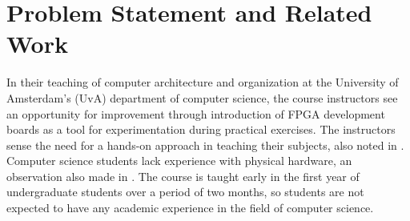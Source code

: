 \documentclass[openright]{template/uva-bachelor-thesis}
\begin{document}





\section{Problem Statement and Related Work}
In their teaching of computer architecture and organization at the University of Amsterdam's (UvA) department of computer science, the course instructors see an opportunity for improvement through introduction of FPGA development boards as a tool for experimentation during practical exercises. The instructors sense the need for a hands-on approach in teaching their subjects, also noted in \cite{cifredo2015computer, oztekin2011bzk}. Computer science students lack experience with physical hardware, an observation also made in \cite{el2011teaching}. The course is taught early in the first year of undergraduate students over a period of two months, so students are not expected to have any academic experience in the field of computer science. 
\end{document}
